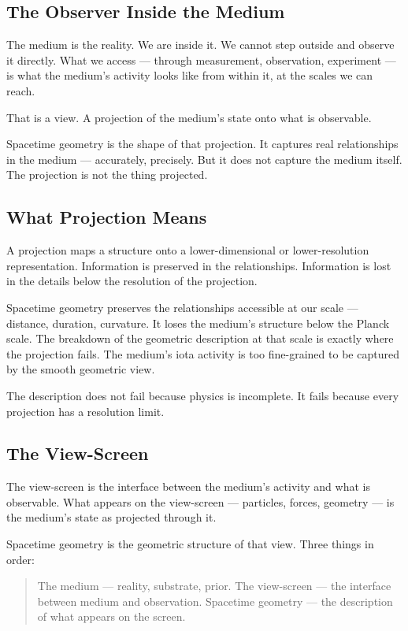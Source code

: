 \documentclass[11pt]{article}
\begin{document}
\subsection{The Observer Inside the Medium}
\label{sec:orgcc62001}

The medium is the reality. We are inside it. We cannot step outside and observe
it directly. What we access — through measurement, observation, experiment — is
what the medium's activity looks like from within it, at the scales we can reach.

That is a view. A projection of the medium's state onto what is observable.

Spacetime geometry is the shape of that projection. It captures real
relationships in the medium — accurately, precisely. But it does not capture the
medium itself. The projection is not the thing projected.

\subsection{What Projection Means}
\label{sec:org4fc735a}

A projection maps a structure onto a lower-dimensional or lower-resolution
representation. Information is preserved in the relationships. Information is
lost in the details below the resolution of the projection.

Spacetime geometry preserves the relationships accessible at our scale —
distance, duration, curvature. It loses the medium's structure below the Planck
scale. The breakdown of the geometric description at that scale is exactly where
the projection fails. The medium's iota activity is too fine-grained to be
captured by the smooth geometric view.

The description does not fail because physics is incomplete. It fails because
every projection has a resolution limit.

\subsection{The View-Screen}
\label{sec:orgfb7e320}

The view-screen is the interface between the medium's activity and what is
observable. What appears on the view-screen — particles, forces, geometry — is
the medium's state as projected through it.

Spacetime geometry is the geometric structure of that view. Three things in
order:

\begin{quote}
The medium — reality, substrate, prior.
The view-screen — the interface between medium and observation.
Spacetime geometry — the description of what appears on the screen.
\end{quote}
\end{document}
